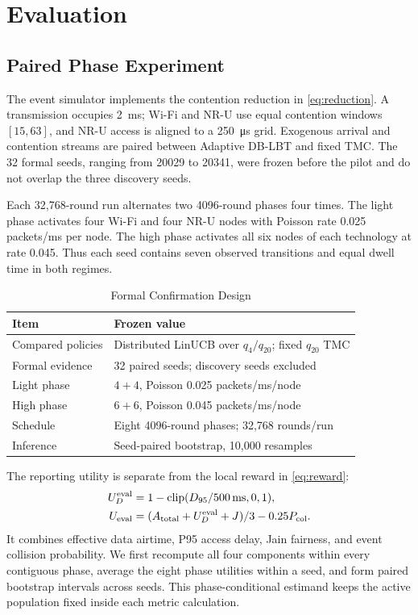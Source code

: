 \section{Evaluation}
\label{sec:evaluation}

\subsection{Paired Phase Experiment}

The event simulator implements the contention reduction in
\eqref{eq:reduction}. A transmission occupies \SI{2}{\milli\second}; Wi-Fi and
NR-U use equal contention windows $[15,63]$, and NR-U access is aligned to a
\SI{250}{\micro\second} grid. Exogenous arrival and contention streams are
paired between Adaptive DB-LBT and fixed TMC. The 32 formal seeds, ranging
from 20029 to 20341, were frozen before the pilot and do not overlap the three
discovery seeds.

Each 32,768-round run alternates two 4096-round phases four times. The light
phase activates four Wi-Fi and four NR-U nodes with Poisson rate 0.025
packets/ms per node. The high phase activates all six nodes of each technology
at rate 0.045. Thus each seed contains seven observed transitions and equal
dwell time in both regimes.

\begin{table}[!t]
\caption{Formal Confirmation Design}
\label{tab:formal-design}
\centering
\footnotesize
\begin{tabularx}{\columnwidth}{@{}p{25mm}Y@{}}
\toprule
Item & Frozen value \\
\midrule
Compared policies & Distributed LinUCB over $q_4/q_{20}$; fixed $q_{20}$ TMC \\
Formal evidence & 32 paired seeds; discovery seeds excluded \\
Light phase & $4+4$, Poisson 0.025 packets/ms/node \\
High phase & $6+6$, Poisson 0.045 packets/ms/node \\
Schedule & Eight 4096-round phases; 32,768 rounds/run \\
Inference & Seed-paired bootstrap, 10,000 resamples \\
\bottomrule
\end{tabularx}
\end{table}

The reporting utility is separate from the local reward in
\eqref{eq:reward}:
\begin{align}
U_D^{\rm eval}&=1-\operatorname{clip}(D_{95}/500\,\mathrm{ms},0,1),\nonumber\\
U_{\rm eval}&=(A_{\rm total}+U_D^{\rm eval}+J)/3-0.25P_{\rm col}.
\label{eq:evaluation-utility}
\end{align}
It combines effective data airtime, P95 access delay, Jain fairness, and event
collision probability. We first recompute all four components within every
contiguous phase, average the eight phase utilities within a seed, and form
paired bootstrap intervals across seeds. This phase-conditional estimand keeps
the active population fixed inside each metric calculation.

